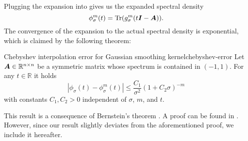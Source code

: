 Plugging the expansion  into 
 gives us the expanded
spectral density
\begin{equation}
    \phi_{\sigma}^m(t) = \operatorname{Tr}(g_{\sigma}^m(t\boldsymbol{I} - \boldsymbol{A})).
    \label{equ:2-chebyshev-spectral-density-as-trace-expansion}
\end{equation}
The convergence of the expansion to the actual spectral density is exponential, 
which is claimed by the following theorem:
\begin{theorem}{Chebyshev interpolation error for Gaussian smoothing kernel}{chebyshev-error}
    Let $\boldsymbol{A} \in \mathbb{R}^{n \times n}$ be a symmetric matrix whose spectrum
    is contained in $(-1, 1)$. For any $t \in \mathbb{R}$ it holds
    \begin{equation}
        \left|  \phi_{\sigma}(t) - \phi_{\sigma}^m(t) \right| \leq \frac{C_1}{\sigma^2}(1 + C_2 \sigma)^{-m}
        \label{equ:2-chebyshev-interpolation-error}
    \end{equation}
    with constants $C_1, C_2 > 0$ independent of $\sigma$, $m$, and $t$.
\end{theorem}
This result is a consequence of Bernstein's theorem \cite[Theorem~73]{meinardus1967approximation}.
A proof can be found in \cite[Theorem~2]{lin2017randomized}. However, since our
result slightly deviates from the aforementioned proof, we include it hereafter.
